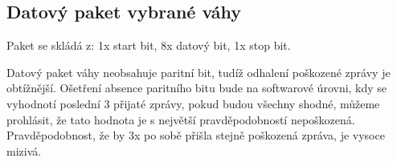 \subsection{Datový paket vybrané váhy}
\label{datový paket váhy}

Paket se skládá z: 1x start bit, 8x datový bit, 1x stop bit.
%

Datový paket váhy neobsahuje paritní bit, tudíž odhalení poškozené zprávy je obtížnější. Ošetření absence paritního bitu bude na softwarové úrovni, kdy se vyhodnotí poslední 3 přijaté zprávy, pokud budou všechny shodné, můžeme prohlásit, že tato hodnota je s největší pravděpodobností nepoškozená. Pravděpodobnost, že by 3x po sobě přišla stejně poškozená zpráva, je vysoce mizivá.







